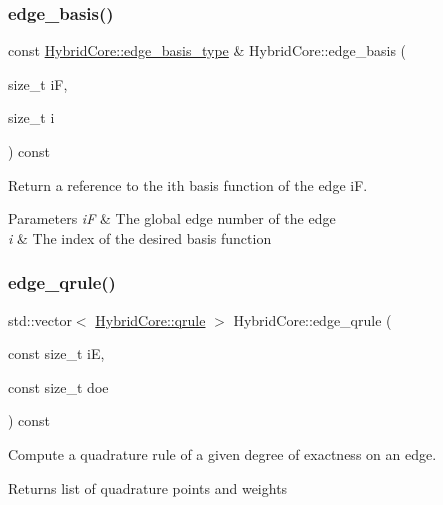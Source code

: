 \subsubsection{\texorpdfstring{edge\+\_\+basis()}{edge\_basis()}}
{\footnotesize\ttfamily const \hyperlink{classHArDCore2D_1_1HybridCore_a1f2030ea16722179fd3523e6e6675948}{Hybrid\+Core\+::edge\+\_\+basis\+\_\+type} \& Hybrid\+Core\+::edge\+\_\+basis (\begin{DoxyParamCaption}\item[{size\+\_\+t}]{iF,  }\item[{size\+\_\+t}]{i }\end{DoxyParamCaption}) const}



Return a reference to the i\textquotesingle{}th basis function of the edge iF. 


\begin{DoxyParams}{Parameters}
{\em iF} & The global edge number of the edge \\
\hline
{\em i} & The index of the desired basis function \\
\hline
\end{DoxyParams}
\mbox{\label{classHArDCore2D_1_1HybridCore_a448297d0d0afefe477815dfb7821b270}} 
\subsubsection{\texorpdfstring{edge\+\_\+qrule()}{edge\_qrule()}}
{\footnotesize\ttfamily std\+::vector$<$ \hyperlink{structHArDCore2D_1_1HybridCore_1_1qrule}{Hybrid\+Core\+::qrule} $>$ Hybrid\+Core\+::edge\+\_\+qrule (\begin{DoxyParamCaption}\item[{const size\+\_\+t}]{iE,  }\item[{const size\+\_\+t}]{doe }\end{DoxyParamCaption}) const}



Compute a quadrature rule of a given degree of exactness on an edge. 

\begin{DoxyReturn}{Returns}
list of quadrature points and weights 
\end{DoxyReturn}

